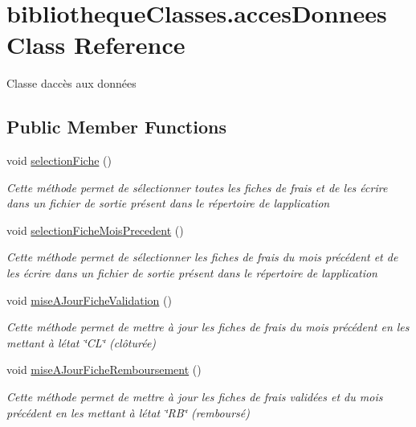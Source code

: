 \hypertarget{classbibliotheque_classes_1_1acces_donnees}{}\section{bibliotheque\+Classes.\+acces\+Donnees Class Reference}
\label{classbibliotheque_classes_1_1acces_donnees}


Classe d\textquotesingle{}accès aux données  


\subsection*{Public Member Functions}
\begin{DoxyCompactItemize}
\item 
void \mbox{\hyperlink{classbibliotheque_classes_1_1acces_donnees_a3d5707c0c32ffef3ffb96024c429962c}{selection\+Fiche}} ()
\begin{DoxyCompactList}\small\item\em Cette méthode permet de sélectionner toutes les fiches de frais et de les écrire dans un fichier de sortie présent dans le répertoire de l\textquotesingle{}application \end{DoxyCompactList}\item 
void \mbox{\hyperlink{classbibliotheque_classes_1_1acces_donnees_a28c549fe1997665d275fd37d97414990}{selection\+Fiche\+Mois\+Precedent}} ()
\begin{DoxyCompactList}\small\item\em Cette méthode permet de sélectionner les fiches de frais du mois précédent et de les écrire dans un fichier de sortie présent dans le répertoire de l\textquotesingle{}application \end{DoxyCompactList}\item 
void \mbox{\hyperlink{classbibliotheque_classes_1_1acces_donnees_a05d611d9c6a77bdcf589092a68e6d262}{mise\+A\+Jour\+Fiche\+Validation}} ()
\begin{DoxyCompactList}\small\item\em Cette méthode permet de mettre à jour les fiches de frais du mois précédent en les mettant à l\textquotesingle{}état \char`\"{}\+C\+L\char`\"{} (clôturée) \end{DoxyCompactList}\item 
void \mbox{\hyperlink{classbibliotheque_classes_1_1acces_donnees_a3f6ab640fe018b0143515d0d8cbeda80}{mise\+A\+Jour\+Fiche\+Remboursement}} ()
\begin{DoxyCompactList}\small\item\em Cette méthode permet de mettre à jour les fiches de frais validées et du mois précédent en les mettant à l\textquotesingle{}état \char`\"{}\+R\+B\char`\"{} (remboursé) \end{DoxyCompactList}\end{DoxyCompactItemize}


